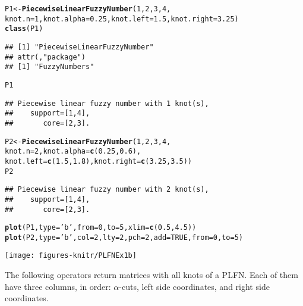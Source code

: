 \documentclass[11pt]{article}\usepackage{graphicx, color}
\makeatletter
\newcommand{\hlfunctioncall}[1]{\textcolor[rgb]{0.501960784313725,0,0.329411764705882}{\textbf{#1}}}%
\newcommand{\hlstring}[1]{\textcolor[rgb]{0.6,0.6,1}{#1}}%
\newenvironment{kframe}{%
 \def\at@end@of@kframe{}%
 \ifinner\ifhmode%
  \def\at@end@of@kframe{\end{minipage}}%
  \begin{minipage}{\columnwidth}%
 \fi\fi%
 \def\FrameCommand##1{\hskip\@totalleftmargin \hskip-\fboxsep
 \colorbox{shadecolor}{##1}\hskip-\fboxsep
     \hskip-\linewidth \hskip-\@totalleftmargin \hskip\columnwidth}%
 \MakeFramed {\advance\hsize-\width
   \@totalleftmargin\z@ \linewidth\hsize
   \@setminipage}}%
 {\par\unskip\endMakeFramed%
 \at@end@of@kframe}
\newenvironment{knitrout}{}{} %
\makeatother
\begin{document}
\begin{knitrout}\small
{}\color{fgcolor}\begin{kframe}
\begin{alltt}
P1 <- \hlfunctioncall{PiecewiseLinearFuzzyNumber}(1, 2, 3, 4,
   knot.n=1, knot.alpha=0.25, knot.left=1.5, knot.right=3.25)
\hlfunctioncall{class}(P1)
\end{alltt}
\begin{verbatim}
## [1] "PiecewiseLinearFuzzyNumber"
## attr(,"package")
## [1] "FuzzyNumbers"
\end{verbatim}
\begin{alltt}
P1
\end{alltt}
\begin{verbatim}
## Piecewise linear fuzzy number with 1 knot(s),
##    support=[1,4],
##       core=[2,3].
\end{verbatim}
\begin{alltt}
P2 <- \hlfunctioncall{PiecewiseLinearFuzzyNumber}(1, 2, 3, 4,
   knot.n=2, knot.alpha=\hlfunctioncall{c}(0.25,0.6),
   knot.left=\hlfunctioncall{c}(1.5,1.8), knot.right=\hlfunctioncall{c}(3.25, 3.5))
P2
\end{alltt}
\begin{verbatim}
## Piecewise linear fuzzy number with 2 knot(s),
##    support=[1,4],
##       core=[2,3].
\end{verbatim}
\begin{alltt}
\hlfunctioncall{plot}(P1, type=\hlstring{'b'}, from=0, to=5, xlim=\hlfunctioncall{c}(0.5,4.5))
\hlfunctioncall{plot}(P2, type=\hlstring{'b'}, col=2, lty=2, pch=2, add=TRUE, from=0, to=5)
\end{alltt}
\end{kframe}
\end{knitrout}


\begin{center}
\begin{knitrout}\small
{}\color{fgcolor}

{\centering \texttt{[image: figures-knitr/PLFNEx1b]} 

}



\end{knitrout}

\end{center}

The following operators return matrices with all knots of a PLFN.
Each of them have three columns, in order: $\alpha$-cuts,
left side coordinates, and right side coordinates.
\end{document}
